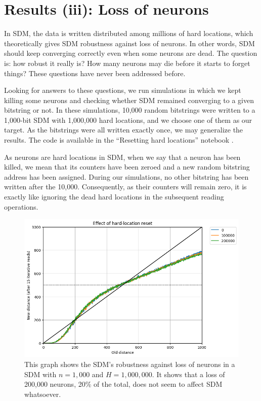 \chapter{Results (iii): Loss of neurons}
In SDM, the data is written distributed among millions of hard locations, which theoretically gives SDM robustness against loss of neurons. In other words, SDM should keep converging correctly even when some neurons are dead. The question is: how robust it really is? How many neurons may die before it starts to forget things? These questions have never been addressed before.

Looking for answers to these questions, we run simulations in which we kept killing some neurons and checking whether SDM remained converging to a given bitstring or not. In these simulations, 10,000 random bitstrings were written to a 1,000-bit SDM with 1,000,000 hard locations, and we choose one of them as our target. As the bitstrings were all written exactly once, we may generalize the results. The code is available in the ``Resetting hard locations'' notebook \citep{sdmframework}.

As neurons are hard locations in SDM, when we say that a neuron has been killed, we mean that its counters have been zeroed and a new random bitstring address has been assigned. During our simulations, no other bitstring has been written after the 10,000. Consequently, as their counters will remain zero, it is exactly like ignoring the dead hard locations in the subsequent reading operations.

\begin{figure}[!p]
\centering\includegraphics[width=\textwidth]{./images02/new-images/sdm-neuron-death-200k.png}
\caption{This graph shows the SDM's robustness against loss of neurons in a SDM with $n=1,000$ and $H=1,000,000$. It shows that a loss of 200,000 neurons, 20\% of the total, does not seem to affect SDM whatsoever.
\label{fig:sdm-neuron-death-200k}}
\end{figure}

